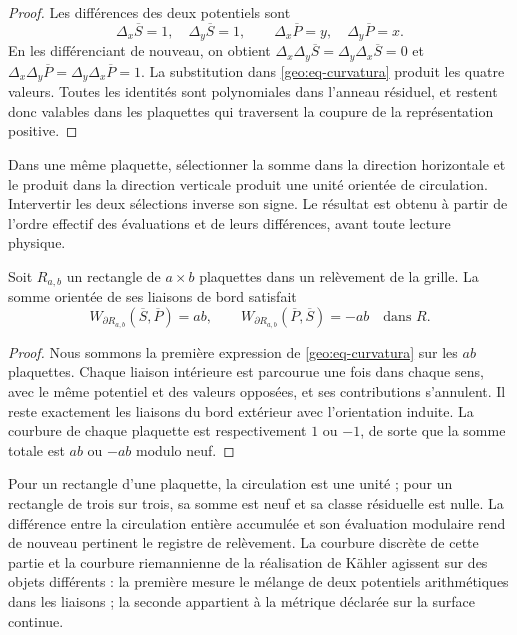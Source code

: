 \begin{proof}
Les différences des deux potentiels sont
\[
 \Delta_x\overline S=1,\quad\Delta_y\overline S=1,
 \qquad
 \Delta_x\overline P=y,\quad\Delta_y\overline P=x.
\]
En les différenciant de nouveau, on obtient $\Delta_x\Delta_y\overline S=\Delta_y\Delta_x\overline S=0$ et $\Delta_x\Delta_y\overline P=\Delta_y\Delta_x\overline P=1$. La substitution dans \eqref{geo:eq-curvatura} produit les quatre valeurs. Toutes les identités sont polynomiales dans l'anneau résiduel, et restent donc valables dans les plaquettes qui traversent la coupure de la représentation positive.
\end{proof}

Dans une même plaquette, sélectionner la somme dans la direction horizontale et le produit dans la direction verticale produit une unité orientée de circulation. Intervertir les deux sélections inverse son signe. Le résultat est obtenu à partir de l'ordre effectif des évaluations et de leurs différences, avant toute lecture physique.

\begin{teorema}
\label{geo:thm-stokes}
Soit $R_{a,b}$ un rectangle de $a\times b$ plaquettes dans un relèvement de la grille. La somme orientée de ses liaisons de bord satisfait
\[
 W_{\partial R_{a,b}}(\overline S,\overline P)=ab,
 \qquad
 W_{\partial R_{a,b}}(\overline P,\overline S)=-ab
 \quad\text{dans }R.
\]
\end{teorema}

\begin{proof}
Nous sommons la première expression de \eqref{geo:eq-curvatura} sur les $ab$ plaquettes. Chaque liaison intérieure est parcourue une fois dans chaque sens, avec le même potentiel et des valeurs opposées, et ses contributions s'annulent. Il reste exactement les liaisons du bord extérieur avec l'orientation induite. La courbure de chaque plaquette est respectivement $1$ ou $-1$, de sorte que la somme totale est $ab$ ou $-ab$ modulo neuf.
\end{proof}

Pour un rectangle d'une plaquette, la circulation est une unité ; pour un rectangle de trois sur trois, sa somme est neuf et sa classe résiduelle est nulle. La différence entre la circulation entière accumulée et son évaluation modulaire rend de nouveau pertinent le registre de relèvement. La courbure discrète de cette partie et la courbure riemannienne de la réalisation de Kähler agissent sur des objets différents : la première mesure le mélange de deux potentiels arithmétiques dans les liaisons ; la seconde appartient à la métrique déclarée sur la surface continue.

